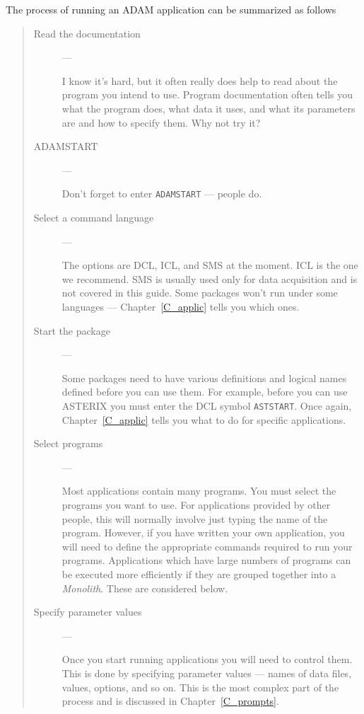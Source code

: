 The process of running an ADAM application can be summarized as follows
\begin{quote}
\begin{description}

\item [Read the documentation] ---

I know it's hard, but it often really does help to read about the program
you intend to use.
Program documentation often tells you what the program does, what data it
uses, and what its parameters are and how to specify them.
Why not try it?

\item [ADAMSTART] ---

Don't forget to enter {\small\tt ADAMSTART} --- people do.

\item [Select a command language] ---

The options are DCL, ICL, and SMS at the moment.
ICL is the one we recommend.
SMS is usually used only for data acquisition and is not covered in this
guide.
Some packages won't run under some languages --- Chapter~\ref{C_applic} tells
you which ones.

\item [Start the package] ---

Some packages need to have various definitions and logical names defined before
you can use them.
For example, before you can use ASTERIX you must enter the DCL symbol
{\small\tt ASTSTART}.
Once again, Chapter~\ref{C_applic} tells you what to do for specific
applications.

\item [Select programs] ---

Most applications contain many programs.
You must select the programs you want to use.
For applications provided by other people, this will normally involve just
typing the name of the program.
However, if you have written your own application, you will need to define
the appropriate commands required to run your programs.
Applications which have large numbers of programs can be executed more
efficiently if they are grouped together into a {\em Monolith}.
These are considered below.

\item [Specify parameter values] ---

Once you start running applications you will need to control them.
This is done by specifying parameter values --- names of data files, values,
options, and so on.
This is the most complex part of the process and is discussed in
Chapter~\ref{C_prompts}.

\end{description}
\end{quote}

